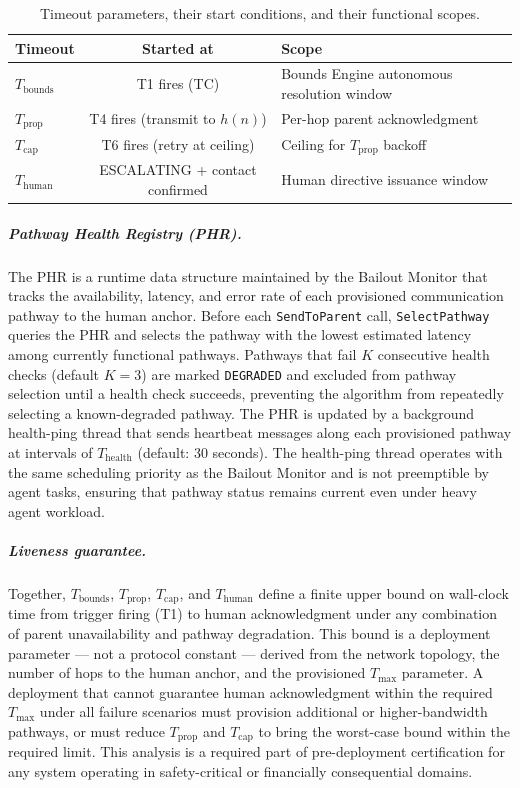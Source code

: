 \begin{table}[htbp]
\centering
\begin{tabular}{lcl}
\hline
\textbf{Timeout} & \textbf{Started at} & \textbf{Scope} \\
\hline
$T_{\text{bounds}}$ & T1 fires (TC) & Bounds Engine autonomous resolution window \\
$T_{\text{prop}}$ & T4 fires (transmit to $h(n)$) & Per-hop parent acknowledgment \\
$T_{\text{cap}}$ & T6 fires (retry at ceiling) & Ceiling for $T_{\text{prop}}$ backoff \\
$T_{\text{human}}$ & ESCALATING + contact confirmed & Human directive issuance window \\
\hline
\end{tabular}
\caption{Timeout parameters, their start conditions, and their functional scopes.}
\label{tab:timeouts}
\end{table}

\subparagraph{Pathway Health Registry (PHR).} The PHR is a runtime data structure maintained by the Bailout Monitor that tracks the availability, latency, and error rate of each provisioned communication pathway to the human anchor. Before each \texttt{SendToParent} call, \texttt{SelectPathway} queries the PHR and selects the pathway with the lowest estimated latency among currently functional pathways. Pathways that fail $K$ consecutive health checks (default $K = 3$) are marked \texttt{DEGRADED} and excluded from pathway selection until a health check succeeds, preventing the algorithm from repeatedly selecting a known-degraded pathway. The PHR is updated by a background health-ping thread that sends heartbeat messages along each provisioned pathway at intervals of $T_{\text{health}}$ (default: 30 seconds). The health-ping thread operates with the same scheduling priority as the Bailout Monitor and is not preemptible by agent tasks, ensuring that pathway status remains current even under heavy agent workload.

\subparagraph{Liveness guarantee.} Together, $T_{\text{bounds}}$, $T_{\text{prop}}$, $T_{\text{cap}}$, and $T_{\text{human}}$ define a finite upper bound on wall-clock time from trigger firing (T1) to human acknowledgment under any combination of parent unavailability and pathway degradation. This bound is a deployment parameter — not a protocol constant — derived from the network topology, the number of hops to the human anchor, and the provisioned $T_{\max}$ parameter. A deployment that cannot guarantee human acknowledgment within the required $T_{\max}$ under all failure scenarios must provision additional or higher-bandwidth pathways, or must reduce $T_{\text{prop}}$ and $T_{\text{cap}}$ to bring the worst-case bound within the required limit. This analysis is a required part of pre-deployment certification for any \bxthree{} system operating in safety-critical or financially consequential domains.
